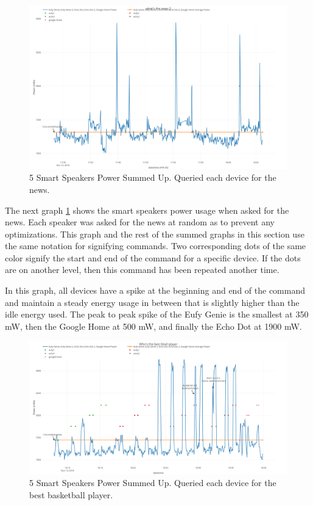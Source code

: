\begin{figure}[H]
  \centering
  \includegraphics[width=1\textwidth]{figures/mixedNewsSum.png}
  \caption{5 Smart Speakers Power Summed Up. Queried each device for the
  news.}
  \label{fig:mixedNewsSum}
\end{figure}

The next graph \ref{fig:mixedNewsSum} shows the smart speakers power usage when asked for the news. Each speaker was asked for the news at random as to prevent any optimizations. This graph and the rest of the summed graphs in this section use the same notation for signifying commands. Two corresponding dots of the same color signify the start and end of the command for a specific device. If the dots are on another level, then this command has been repeated another time.

In this graph, all devices have a spike at the beginning and end of the command and maintain a steady energy usage in between that is slightly higher than the idle energy used. The peak to peak spike of the Eufy Genie is the smallest at 350 mW, then the Google Home at 500 mW, and finally the Echo Dot at 1900 mW.

\begin{figure}[H]
  \centering
  \includegraphics[width=1\textwidth]{figures/bestBballSum.png}
  \caption{5 Smart Speakers Power Summed Up. Queried each device for the
  best basketball player.}
  \label{fig:bestBballSum}
\end{figure}


